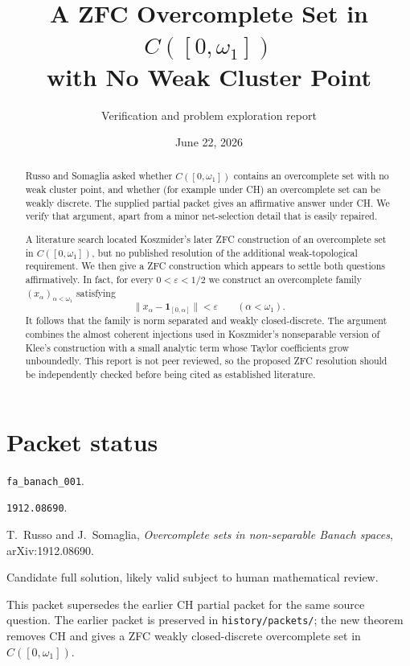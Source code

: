 \documentclass[11pt]{article}
\title{A ZFC Overcomplete Set in $C([0,\omega_1])$\\
with No Weak Cluster Point}
\author{Verification and problem exploration report}
\date{June 22, 2026}
\theoremstyle{remark}
\newcommand{\one}{\mathbf 1}
\begin{document}
\maketitle

\begin{abstract}
Russo and Somaglia asked whether $C([0,\omega_1])$ contains an overcomplete
set with no weak cluster point, and whether (for example under CH) an
overcomplete set can be weakly discrete.  The supplied partial packet gives an
affirmative answer under CH.  We verify that argument, apart from a minor
net-selection detail that is easily repaired.

A literature search located Koszmider's later ZFC construction of an
overcomplete set in $C([0,\omega_1])$, but no published resolution of the
additional weak-topological requirement.  We then give a ZFC construction
which appears to settle both questions affirmatively.  In fact, for every
$0<\varepsilon<1/2$ we construct an overcomplete family
$(x_\alpha)_{\alpha<\omega_1}$ satisfying
\[
  \bigl\|x_\alpha-\one_{[0,\alpha]}\bigr\|<\varepsilon
  \qquad(\alpha<\omega_1).
\]
It follows that the family is norm separated and weakly closed-discrete.
The argument combines the almost coherent injections used in Koszmider's
nonseparable version of Klee's construction with a small analytic term whose
Taylor coefficients grow unboundedly.  This report is not peer reviewed, so
the proposed ZFC resolution should be independently checked before being
cited as established literature.
\end{abstract}

\section*{Packet status}

\begin{description}[leftmargin=2.8cm,style=nextline]
\item[Run] \texttt{fa\_banach\_001}.
\item[Source arXiv id] \texttt{1912.08690}.
\item[Source paper] T.~Russo and J.~Somaglia, \emph{Overcomplete sets in
non-separable Banach spaces}, arXiv:1912.08690.
\item[Packet classification] Candidate full solution, likely valid subject to
human mathematical review.
\item[Upgrade note] This packet supersedes the earlier CH partial packet for
the same source question.  The earlier packet is preserved in
\texttt{history/packets/}; the new theorem removes CH and gives a ZFC
weakly closed-discrete overcomplete set in \(C([0,\omega_1])\).
\end{description}
\end{document}

